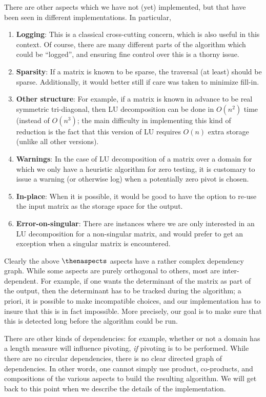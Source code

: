 \documentclass[draft]{elsart}
\begin{document}
There are other aspects which we have not (yet) implemented, but that have
been seen in different implementations.  In particular,
\begin{enumerate}
\setcounter{enumi}{\value{naspects}}
\item \textbf{Logging}: This is a classical cross-cutting concern, which
is also useful in this context.  Of course, there are many different
parts of the algorithm which could be ``logged'', and ensuring fine control
over this is a thorny issue.
\item \textbf{Sparsity}: If a matrix is known to be sparse, the traversal
(at least) should be sparse.  Additionally, it would better still if
care was taken to minimize fill-in.
\item \textbf{Other structure}: For example, if a matrix is known in
advance to be real symmetric tri-diagonal, then LU decomposition can be
done in $O(n^2)$ time (instead of $O(n^3)$; the main difficulty in 
implementing this kind of reduction is the fact that this version of 
LU requires $O(n)$ extra storage (unlike all other versions).
\item \textbf{Warnings}: In the case of LU decomposition of a matrix over
a domain for which we only have a heuristic algorithm for zero
testing, it is customary to issue a warning (or otherwise log) when 
a potentially zero pivot is chosen.
\item \textbf{In-place}: When it is possible, it would be good to have the
option to re-use the input matrix as the storage space for the output.
\item \textbf{Error-on-singular}: There are instances where we are only
interested in an LU decomposition for a non-singular matrix, and would
prefer to get an exception when a singular matrix is encountered.
\setcounter{naspects}{\value{enumi}}
\end {enumerate}

Clearly the above $\thenaspects$ aspects have a rather complex 
dependency graph.  While some aspects are purely orthogonal to others, 
most are inter-dependent.  For example, if one wants the determinant of
the matrix as part of the output, then the determinant has to be tracked
during the algorithm; a priori, it is possible to make incompatible choices,
and our implementation has to insure that this is in fact impossible.
More precisely, our goal is to make sure that this is detected long
before the algorithm could be run.

There are other kinds of dependencies: for example, whether or not a 
domain has a length measure will influence pivoting, \emph{if} pivoting
is to be performed.  While there are no circular dependencies, there is
no clear directed graph of dependencies.  In other words, one cannot 
simply use product, co-products, and compositions of the various aspects 
to build the resulting algorithm.  We will get back to this point when
we describe the details of the implementation.
\end{document}
